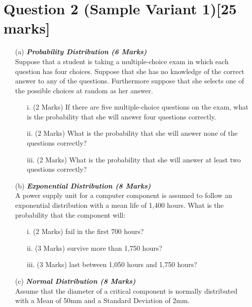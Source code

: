 
\section*{Question 2 (Sample Variant 1)[25 marks]}
\begin{itemize}

\item[(a)] \textbf{\textit{Probability Distribution (6 Marks)}}\\ %
Suppose that a student is taking a multiple-choice exam in which each question has four choices.
Suppose that she has no knowledge of the correct answer to any of the questions. Furthermore suppose that she selects one of the possible choices at random as her answer.
\begin{itemize}
\item [i.](2 Marks) If there are five multiple-choice questions on the exam, what is the probability that she will answer four questions correctly.
\item [ii.](2 Marks) What is the probability that she will answer none of the questions correctly?
\item [iii.](2 Marks) What is the probability that she will answer at least two questions correctly?
\end{itemize}

\item[(b)] \textbf{\textit{Exponential Distribution (8 Marks)}}\\ %
A power supply unit for a computer component is assumed to follow an exponential distribution with a mean life of 1,400 hours.  What is the probability that the component will:
\begin{itemize}
\item [i.](2 Marks)	fail in the first 700 hours?
\item [ii.](3 Marks) survive more than 1,750 hours?
\item [iii.](3 Marks) last between 1,050 hours and 1,750 hours?
\end{itemize}


\item[(c)] \textbf{\textit{Normal Distribution (8 Marks)}}\\
Assume that the diameter of a critical component is normally distributed with a Mean of 50mm and a Standard Deviation of 2mm.


\end{itemize}
